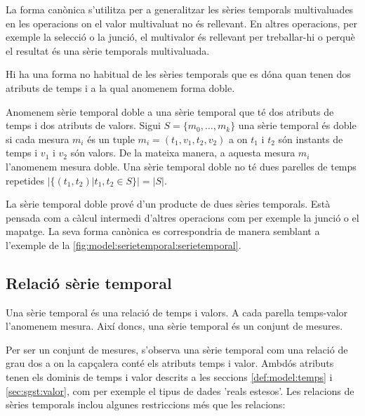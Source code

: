 La forma canònica s'utilitza per a generalitzar les sèries temporals
multivaluades en les operacions on el valor multivaluat no és
rellevant. En altres operacions, per exemple la selecció o la junció,
el multivalor és rellevant per treballar-hi o perquè el resultat és
una sèrie temporals multivaluada. 



Hi ha una forma no habitual de les sèries temporals que es dóna quan
tenen dos atributs de temps i a la qual anomenem forma doble.

\begin{definition}
  \label{def:sgst:st-doble}
  Anomenem sèrie temporal doble a una sèrie temporal que té dos
  atributs de temps i dos atributs de valors. Sigui $S =\{m_0, \dotsc,
  m_k\}$ una sèrie temporal és doble si cada mesura $m_i$ és un tuple
  $m_i=(t_1,v_1,t_2,v_2)$ a on $t_1$ i $t_2$ són instants de temps i
  $v_1$ i $v_2$ són valors. De la mateixa manera, a aquesta mesura
  $m_i$ l'anomenem mesura doble.  Una sèrie temporal doble no té dues
  parelles de temps repetides $|\{(t_1,t_2) | t_1,t_2\in S\}| = |S|$.
\end{definition}

La sèrie temporal doble prové d'un producte de dues sèries
temporals. Està pensada com a càlcul intermedi d'altres operacions com
per exemple la junció o el mapatge. La seva forma canònica es
correspondria de manera semblant a l'exemple de la
\autoref{fig:model:serietemporal:serietemporal}.









\subsection{Relació sèrie temporal}

Una sèrie temporal és una relació de temps i valors. A cada parella temps-valor l'anomenem mesura. Així doncs, una sèrie temporal és un conjunt de mesures.

Per ser un conjunt de mesures, s'observa una sèrie temporal com una
relació de grau dos a on la capçalera conté els atributs temps i
valor. Ambdós atributs tenen els dominis de temps i valor descrits a
les seccions \ref{def:model:temps} i \ref{sec:sgst:valor}, com per
exemple el tipus de dades 'reals estesos'. Les relacions de sèries
temporals inclou algunes restriccions més que les relacions:

